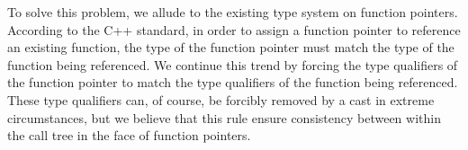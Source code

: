 To solve this problem, we allude to the existing type system on function pointers.  According to the C++ standard, in order to assign a function pointer to reference an existing function, the type of the function pointer must match the type of the function being referenced.  We continue this trend by forcing the type qualifiers of the function pointer to match the type qualifiers of the function being referenced.  These type qualifiers can, of course, be forcibly removed by a cast in extreme circumstances, but we believe that this rule ensure consistency between within the call tree in the face of function pointers.
